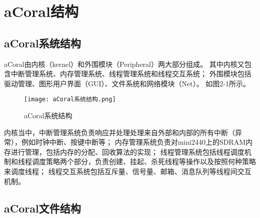 \chapter{aCoral结构}

\section{aCoral系统结构}
aCoral由内核（kernel）和外围模块（Peripheral）两大部分组成。
其中内核又包含中断管理系统、内存管理系统、线程管理系统和线程交互系统；
外围模块包括驱动管理、图形用户界面（GUI）、文件系统和网络模块（Net）。
如图2-1所示。

\begin{figure}[htb]
	\texttt{[image: aCoral系统结构.png]}
	\caption{aCoral系统结构}
	\label{pica}
\end{figure}

内核当中，中断管理系统负责响应并处理处理来自外部和内部的所有中断（异常），例如时钟中断、按键中断等；
内存管理系统负责对mini2440上的SDRAM内存进行管理，包括内存的分配、回收算法的实现；
线程管理系统包括线程调度机制和线程调度策略两个部分，负责创建、挂起、杀死线程等操作以及按照何种策略来调度线程；
线程交互系统包括互斥量、信号量、邮箱、消息队列等线程间交互机制。

\section{aCoral文件结构}
